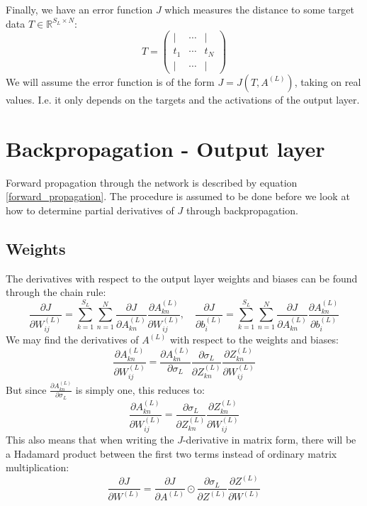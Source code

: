 \documentclass[12pt, a4paper]{article}
\numberwithin{equation}{section}
\begin{document}
Finally, we have an error function $J$ which measures the distance to some target data $T\in\mathbb{R}^{S_L\times N}$:
\begin{equation}
T=
\begin{pmatrix}
| & \cdots & | \\
t_1 & \cdots & t_N \\
| & \cdots & |
\end{pmatrix}
\end{equation}
We will assume the error function is of the form $J=J(T,A^{(L)})$, taking on real values. I.e. it only depends on the targets and the activations of the output layer.

\section{Backpropagation - Output layer}
Forward propagation through the network is described by equation \ref{forward_propagation}. The procedure is assumed to be done before we look at how to determine partial derivatives of $J$ through backpropagation.

\subsection{Weights}
The derivatives with respect to the output layer weights and biases can be found through the chain rule:
\begin{equation}
\label{output_grad}
\frac{\partial J}{\partial W^{(L)}_{ij}}=\sum_{k=1}^{S_L}\sum_{n=1}^N\frac{\partial J}{\partial A^{(L)}_{kn}}\frac{\partial A^{(L)}_{kn}}{\partial W^{(L)}_{ij}},\quad\frac{\partial J}{\partial b^{(L)}_i}=\sum_{k=1}^{S_L}\sum_{n=1}^N\frac{\partial J}{\partial A^{(L)}_{kn}}\frac{\partial A^{(L)}_{kn}}{\partial b^{(L)}_i}
\end{equation}
We may find the derivatives of $A^{(L)}$ with respect to the weights and biases:
\begin{equation}
\frac{\partial A^{(L)}_{kn}}{\partial W^{(L)}_{ij}}=\frac{\partial A^{(L)}_{kn}}{\partial\sigma_L}\frac{\partial\sigma_L}{\partial Z^{(L)}_{kn}}\frac{\partial Z^{(L)}_{kn}}{\partial W^{(L)}_{ij}}
\end{equation}
But since $\frac{\partial A^{(L)}_{kn}}{\partial\sigma_L}$ is simply one, this reduces to:
\begin{equation}
\label{output_a_grad}
\frac{\partial A^{(L)}_{kn}}{\partial W^{(L)}_{ij}}=\frac{\partial\sigma_L}{\partial Z^{(L)}_{kn}}\frac{\partial Z^{(L)}_{kn}}{\partial W^{(L)}_{ij}}
\end{equation}
This also means that when writing the $J$-derivative in matrix form, there will be a Hadamard product between the first two terms instead of ordinary matrix multiplication:
\begin{equation}
\label{hadamard_diff}
\frac{\partial J}{\partial W^{(L)}}=\frac{\partial J}{\partial A^{(L)}}\odot\frac{\partial\sigma_L}{\partial Z^{(L)}}\frac{\partial Z^{(L)}}{\partial W^{(L)}}
\end{equation}
\end{document}
